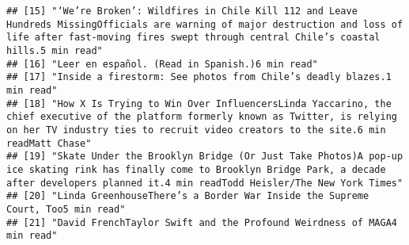 \documentclass[
]{article}
\begin{document}
\begin{verbatim}
## [15] "‘We’re Broken’: Wildfires in Chile Kill 112 and Leave Hundreds MissingOfficials are warning of major destruction and loss of life after fast-moving fires swept through central Chile’s coastal hills.5 min read"                                                                                                                                                                                                     
## [16] "Leer en español. (Read in Spanish.)6 min read"                                                                                                                                                                                                                                                                                                                                                                        
## [17] "Inside a firestorm: See photos from Chile’s deadly blazes.1 min read"                                                                                                                                                                                                                                                                                                                                                 
## [18] "How X Is Trying to Win Over InfluencersLinda Yaccarino, the chief executive of the platform formerly known as Twitter, is relying on her TV industry ties to recruit video creators to the site.6 min readMatt Chase"                                                                                                                                                                                                 
## [19] "Skate Under the Brooklyn Bridge (Or Just Take Photos)A pop-up ice skating rink has finally come to Brooklyn Bridge Park, a decade after developers planned it.4 min readTodd Heisler/The New York Times"                                                                                                                                                                                                              
## [20] "Linda GreenhouseThere’s a Border War Inside the Supreme Court, Too5 min read"                                                                                                                                                                                                                                                                                                                                         
## [21] "David FrenchTaylor Swift and the Profound Weirdness of MAGA4 min read"                                                                                                                                                                                                                                                                                                                                                

\end{verbatim}
\end{document}
